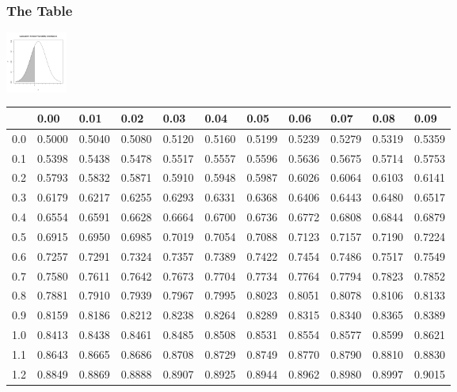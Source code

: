 \begin{frame}
  \vspace*{-5em}
  \frametitle{The Table}
  \hfill\includegraphics[width=2cm]{img/cummulativeDist}~~~~~~~~~~~~~~

  {
\fontsize{5pt}{5pt}
\selectfont
\begin{tabular}{l|llllllllll}
     & 0.00   & 0.01   & 0.02   & 0.03   & 0.04   & 0.05   & 0.06   & 0.07   & 0.08  & 0.09 \\ \hline
0.0 & 0.5000 & 0.5040 & 0.5080 & 0.5120 & 0.5160 & 0.5199 & 0.5239 & 0.5279 & 0.5319 & 0.5359 \\ 
0.1 & 0.5398 & 0.5438 & 0.5478 & 0.5517 & 0.5557 & 0.5596 & 0.5636 & 0.5675 & 0.5714 & 0.5753 \\ 
0.2 & 0.5793 & 0.5832 & 0.5871 & 0.5910 & 0.5948 & 0.5987 & 0.6026 & 0.6064 & 0.6103 & 0.6141 \\ 
0.3 & 0.6179 & 0.6217 & 0.6255 & 0.6293 & 0.6331 & 0.6368 & 0.6406 & 0.6443 & 0.6480 & 0.6517 \\ 
0.4 & 0.6554 & 0.6591 & 0.6628 & 0.6664 & 0.6700 & 0.6736 & 0.6772 & 0.6808 & 0.6844 & 0.6879 \\ 
0.5 & 0.6915 & 0.6950 & 0.6985 & 0.7019 & 0.7054 & 0.7088 & 0.7123 & 0.7157 & 0.7190 & 0.7224 \\ 
0.6 & 0.7257 & 0.7291 & 0.7324 & 0.7357 & 0.7389 & 0.7422 & 0.7454 & 0.7486 & 0.7517 & 0.7549 \\ 
0.7 & 0.7580 & 0.7611 & 0.7642 & 0.7673 & 0.7704 & 0.7734 & 0.7764 & 0.7794 & 0.7823 & 0.7852 \\ 
0.8 & 0.7881 & 0.7910 & 0.7939 & 0.7967 & 0.7995 & 0.8023 & 0.8051 & 0.8078 & 0.8106 & 0.8133 \\ 
0.9 & 0.8159 & 0.8186 & 0.8212 & 0.8238 & 0.8264 & 0.8289 & 0.8315 & 0.8340 & 0.8365 & 0.8389 \\ 
1.0 & 0.8413 & 0.8438 & 0.8461 & 0.8485 & 0.8508 & 0.8531 & 0.8554 & 0.8577 & 0.8599 & 0.8621 \\ 
1.1 & 0.8643 & 0.8665 & 0.8686 & 0.8708 & 0.8729 & 0.8749 & 0.8770 & 0.8790 & 0.8810 & 0.8830 \\ 
1.2 & 0.8849 & 0.8869 & 0.8888 & 0.8907 & 0.8925 & 0.8944 & 0.8962 & 0.8980 & 0.8997 & 0.9015 \\ 

\end{tabular}}
\end{frame}
